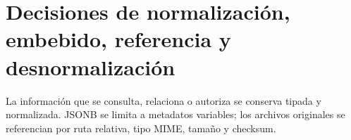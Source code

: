 \section{Decisiones de normalización, embebido, referencia y desnormalización}
La información que se consulta, relaciona o autoriza se conserva tipada y normalizada. JSONB se limita a metadatos variables; los archivos originales se referencian por ruta relativa, tipo MIME, tamaño y checksum.
